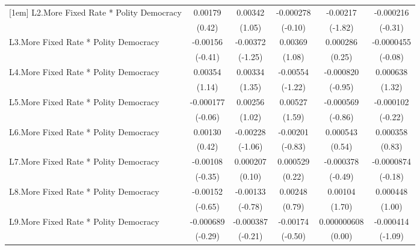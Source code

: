 {\begin{tabular}{l*{5}{c}}
[1em]
L2.More Fixed Rate * Polity Democracy&  0.00179         &  0.00342         &-0.000278         & -0.00217         &-0.000216         \\
                &   (0.42)         &   (1.05)         &  (-0.10)         &  (-1.82)         &  (-0.31)         \\
[1em]
L3.More Fixed Rate * Polity Democracy& -0.00156         & -0.00372         &  0.00369         & 0.000286         &-0.0000455         \\
                &  (-0.41)         &  (-1.25)         &   (1.08)         &   (0.25)         &  (-0.08)         \\
[1em]
L4.More Fixed Rate * Polity Democracy&  0.00354         &  0.00334         & -0.00554         &-0.000820         & 0.000638         \\
                &   (1.14)         &   (1.35)         &  (-1.22)         &  (-0.95)         &   (1.32)         \\
[1em]
L5.More Fixed Rate * Polity Democracy&-0.000177         &  0.00256         &  0.00527         &-0.000569         &-0.000102         \\
                &  (-0.06)         &   (1.02)         &   (1.59)         &  (-0.86)         &  (-0.22)         \\
[1em]
L6.More Fixed Rate * Polity Democracy&  0.00130         & -0.00228         & -0.00201         & 0.000543         & 0.000358         \\
                &   (0.42)         &  (-1.06)         &  (-0.83)         &   (0.54)         &   (0.83)         \\
[1em]
L7.More Fixed Rate * Polity Democracy& -0.00108         & 0.000207         & 0.000529         &-0.000378         &-0.0000874         \\
                &  (-0.35)         &   (0.10)         &   (0.22)         &  (-0.49)         &  (-0.18)         \\
[1em]
L8.More Fixed Rate * Polity Democracy& -0.00152         & -0.00133         &  0.00248         &  0.00104         & 0.000448         \\
                &  (-0.65)         &  (-0.78)         &   (0.79)         &   (1.70)         &   (1.00)         \\
[1em]
L9.More Fixed Rate * Polity Democracy&-0.000689         &-0.000387         & -0.00174         &0.000000608         &-0.000414         \\
                &  (-0.29)         &  (-0.21)         &  (-0.50)         &   (0.00)         &  (-1.09)         \\

\end{tabular}}
